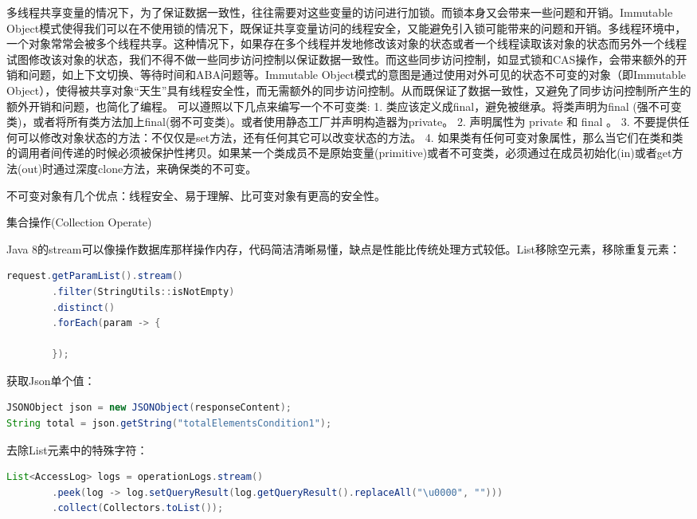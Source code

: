 \documentclass[12pt]{book}
\makeatletter
\numberwithin{dummy}{section}
\theoremstyle{ocrenumbox}
\theoremstyle{blacknumex}
\theoremstyle{blacknumbox}
\theoremstyle{ocrenum}
\renewcommand{\subsection}{\@startsection {subsection}{2}{\z@}
	{-3ex \@plus -0.1ex \@minus -.4ex}
	{0.5ex \@plus.2ex }
	{\normalfont\sffamily\bfseries}}
\newlength\esp
\makeatother
\begin{document}
多线程共享变量的情况下，为了保证数据一致性，往往需要对这些变量的访问进行加锁。而锁本身又会带来一些问题和开销。Immutable Object模式使得我们可以在不使用锁的情况下，既保证共享变量访问的线程安全，又能避免引入锁可能带来的问题和开销。多线程环境中，一个对象常常会被多个线程共享。这种情况下，如果存在多个线程并发地修改该对象的状态或者一个线程读取该对象的状态而另外一个线程试图修改该对象的状态，我们不得不做一些同步访问控制以保证数据一致性。而这些同步访问控制，如显式锁和CAS操作，会带来额外的开销和问题，如上下文切换、等待时间和ABA问题等。Immutable Object模式的意图是通过使用对外可见的状态不可变的对象（即Immutable Object），使得被共享对象“天生”具有线程安全性，而无需额外的同步访问控制。从而既保证了数据一致性，又避免了同步访问控制所产生的额外开销和问题，也简化了编程。
可以遵照以下几点来编写一个不可变类:
1. 类应该定义成final，避免被继承。将类声明为final (强不可变类)，或者将所有类方法加上final(弱不可变类)。或者使用静态工厂并声明构造器为private。
2. 声明属性为 private 和 final 。
3. 不要提供任何可以修改对象状态的方法：不仅仅是set方法，还有任何其它可以改变状态的方法。
4. 如果类有任何可变对象属性，那么当它们在类和类的调用者间传递的时候必须被保护性拷贝。如果某一个类成员不是原始变量(primitive)或者不可变类，必须通过在成员初始化(in)或者get方法(out)时通过深度clone方法，来确保类的不可变。	

不可变对象有几个优点：线程安全、易于理解、比可变对象有更高的安全性。


\subsection{集合操作(Collection Operate)}

Java 8的stream可以像操作数据库那样操作内存，代码简洁清晰易懂，缺点是性能比传统处理方式较低。List移除空元素，移除重复元素：

\begin{lstlisting}[language=Java]
request.getParamList().stream()
		.filter(StringUtils::isNotEmpty)
		.distinct()
		.forEach(param -> {
		
		});
\end{lstlisting}

获取Json单个值：

\begin{lstlisting}[language=Java]
JSONObject json = new JSONObject(responseContent);
String total = json.getString("totalElementsCondition1");
\end{lstlisting}

去除List元素中的特殊字符：

\begin{lstlisting}[language=Java]
List<AccessLog> logs = operationLogs.stream()
		.peek(log -> log.setQueryResult(log.getQueryResult().replaceAll("\u0000", "")))
		.collect(Collectors.toList());
\end{lstlisting}
\end{document}
